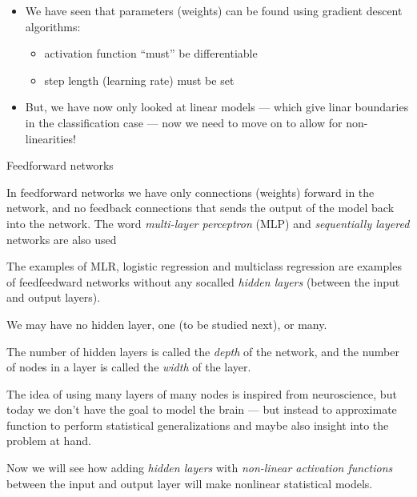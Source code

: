 \documentclass[10pt,ignorenonframetext,]{beamer}
\providecommand{\tightlist}{%
  \setlength{\itemsep}{0pt}\setlength{\parskip}{0pt}}
\begin{document}
\begin{frame}

\begin{itemize}
\tightlist
\item
  We have seen that parameters (weights) can be found using gradient
  descent algorithms:

  \begin{itemize}
  \tightlist
  \item
    activation function ``must'' be differentiable
  \item
    step length (learning rate) must be set
  \end{itemize}
\item
  But, we have now only looked at linear models --- which give linar
  boundaries in the classification case --- now we need to move on to
  allow for non-linearities!
\end{itemize}

\end{frame}

\begin{frame}{Feedforward networks}
\protect\hypertarget{feedforward-networks}{}

In feedforward networks we have only connections (weights) forward in
the network, and no feedback connections that sends the output of the
model back into the network. The word \emph{multi-layer perceptron}
(MLP) and \emph{sequentially layered} networks are also used

The examples of MLR, logistic regression and multiclass regression are
examples of feedfeedward networks without any socalled \emph{hidden
layers} (between the input and output layers).

We may have no hidden layer, one (to be studied next), or many.

The number of hidden layers is called the \emph{depth} of the network,
and the number of nodes in a layer is called the \emph{width} of the
layer.

\end{frame}

\begin{frame}

The idea of using many layers of many nodes is inspired from
neuroscience, but today we don't have the goal to model the brain ---
but instead to approximate function to perform statistical
generalizations and maybe also insight into the problem at hand.

Now we will see how adding \emph{hidden layers} with \emph{non-linear
activation functions} between the input and output layer will make
nonlinear statistical models.

\end{frame}
\end{document}

